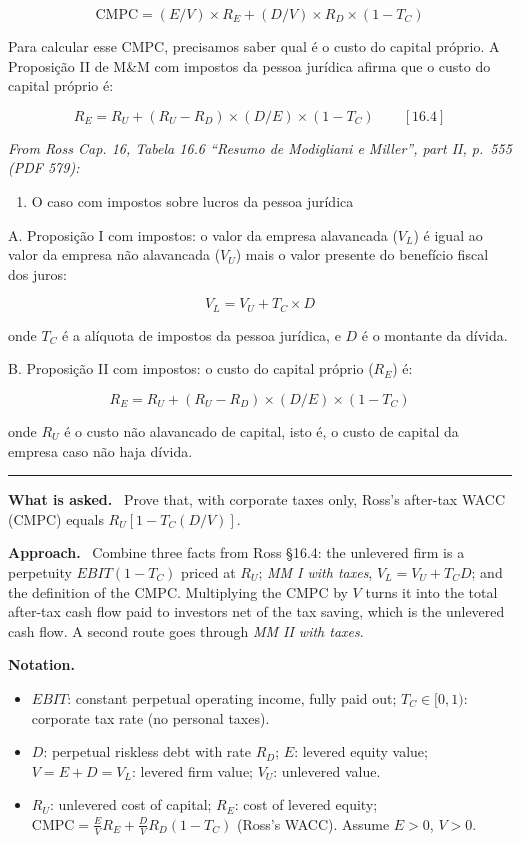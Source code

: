 \documentclass[11pt,a4paper]{article}
\numberwithin{equation}{section}
\newcommand{\notation}{\par\smallskip\noindent\textbf{Notation.}}
\newcommand{\asked}{\par\medskip\noindent\textbf{What is asked.}~}
\newcommand{\approach}{\par\smallskip\noindent\textbf{Approach.}~}
\providecommand{\tightlist}{\setlength{\itemsep}{0pt}\setlength{\parskip}{0pt}}
\newcommand{\stmtend}{\par\endgroup\nopagebreak\noindent\rule{\linewidth}{0.4pt}\par\medskip}
\begin{document}
\[\text{CMPC} = (E/V) \times R_E + (D/V) \times R_D \times (1 - T_C)\]

Para calcular esse CMPC, precisamos saber qual é o custo do capital próprio. A Proposição II de M\&M
com impostos da pessoa jurídica afirma que o custo do capital próprio é:

\[R_E = R_U + (R_U - R_D) \times (D/E) \times (1 - T_C) \qquad [16.4]\]

\emph{From Ross Cap. 16, Tabela 16.6 ``Resumo de Modigliani e Miller'', part II, p.~555 (PDF 579):}

\begin{enumerate}
\def\labelenumi{\Roman{enumi}.}
\setcounter{enumi}{1}
\tightlist
\item
  O caso com impostos sobre lucros da pessoa jurídica
\end{enumerate}

A. Proposição I com impostos: o valor da empresa alavancada (\(V_L\)) é igual ao valor da empresa
não alavancada (\(V_U\)) mais o valor presente do benefício fiscal dos juros:

\[V_L = V_U + T_C \times D\]

onde \(T_C\) é a alíquota de impostos da pessoa jurídica, e \(D\) é o montante da dívida.

B. Proposição II com impostos: o custo do capital próprio (\(R_E\)) é:

\[R_E = R_U + (R_U - R_D) \times (D/E) \times (1 - T_C)\]

onde \(R_U\) é o custo não alavancado de capital, isto é, o custo de capital da empresa caso não
haja dívida.
\stmtend

\asked
Prove that, with corporate taxes only, Ross's after-tax WACC (CMPC) equals $R_U[1-T_C(D/V)]$.

\approach
Combine three facts from Ross §16.4: the unlevered firm is a perpetuity $\mathit{EBIT}(1-T_C)$
priced at $R_U$; \emph{MM I with taxes}, $V_L=V_U+T_CD$; and the definition of the CMPC. Multiplying
the CMPC by $V$ turns it into the total after-tax cash flow paid to investors net of the tax
saving, which is the unlevered cash flow. A second route goes through \emph{MM II with taxes}.

\notation
\begin{itemize}
  \item $\mathit{EBIT}$: constant perpetual operating income, fully paid out; $T_C\in[0,1)$: corporate tax rate (no personal taxes).
  \item $D$: perpetual riskless debt with rate $R_D$; $E$: levered equity value; $V=E+D=V_L$: levered firm value; $V_U$: unlevered value.
  \item $R_U$: unlevered cost of capital; $R_E$: cost of levered equity; $\text{CMPC}=\tfrac{E}{V}R_E+\tfrac{D}{V}R_D(1-T_C)$ (Ross's WACC). Assume $E>0$, $V>0$.
\end{itemize}
\end{document}
